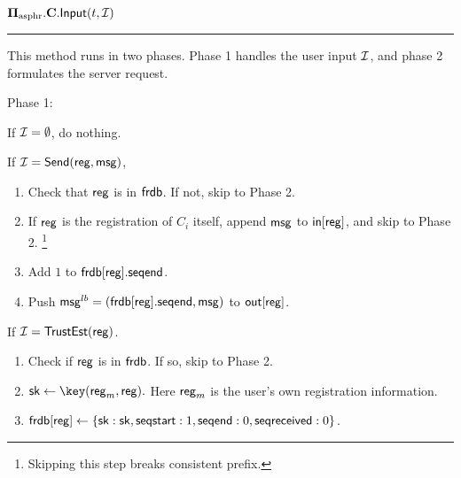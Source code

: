 \begin{definition}
\vspace{10pt}
$\mathbf{\Pi_{\text{asphr}}.C.\mathsf{Input}}(t, \mathcal{I})$
\vspace{5pt}
\hrule
\vspace{5pt}
This method runs in two phases. Phase 1 handles the user input $\mathcal{I}$, and phase 2 formulates the server request.

Phase 1: 

If $\mathcal{I} = \emptyset$, do nothing. 

If $\mathcal{I} = \mathsf{Send}(\mathsf{reg}, \mathsf{msg})$, 

\begin{enumerate}
    \item Check that $\mathsf{reg}$ is in $\mathsf{frdb}$. If not, skip to Phase 2.
    \item If $\mathsf{reg}$ is the registration of $C_i$ itself, append $\mathsf{msg}$ to $\mathsf{in}[\mathsf{reg}]$, and skip to Phase 2. \footnote{Skipping this step breaks consistent prefix.}
    \item Add $1$ to $\mathsf{frdb}[\mathsf{reg}].\mathsf{seqend}$. 
    \item Push $\mathsf{msg}^{lb} = (\mathsf{frdb}[\mathsf{reg}].\mathsf{seqend}, \mathsf{msg})$ to $\mathsf{out}[\mathsf{reg}]$.
\end{enumerate}

If $\mathcal{I} = \mathsf{TrustEst}(\mathsf{reg})$.
\begin{enumerate}
    \item Check if $\mathsf{reg}$ is in $\mathsf{frdb}$. If so, skip to Phase 2.
    \item $\sk \leftarrow \key(\reg_m, \reg).$ Here $\mathsf{reg}_m$ is the user's own registration information.
    \item $\mathsf{frdb}[\mathsf{reg}] \leftarrow \{{\mathsf{sk}}: {\mathsf{sk}},  \mathsf{seqstart}: 1, \mathsf{seqend}: 0, \mathsf{seqreceived}: 0\}$.
\end{enumerate}


\end{definition}
